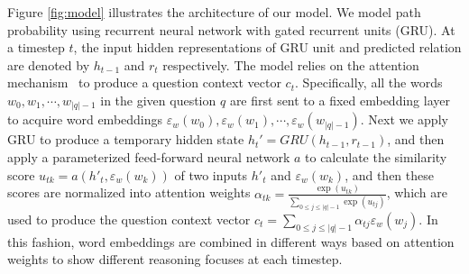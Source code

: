 

Figure \ref{fig:model} illustrates the architecture of our model. We model path probability using recurrent neural network with gated recurrent units (GRU). At a timestep $t$, the input hidden representations of GRU unit and predicted relation are denoted by $h_{t-1}$ and $r_t$ respectively. The model relies on the attention mechanism~\cite{DBLP:journals/corr/BahdanauCB14} to produce a question context vector $c_t$. Specifically, all the words $w_0,w_1,\cdots,w_{|q|-1}$ in the given question $q$ are first sent to a fixed embedding layer to acquire word embeddings $\varepsilon_w(w_0),\varepsilon_w(w_1),\cdots,\varepsilon_w(w_{|q|-1})$. Next we apply GRU to produce a temporary hidden state $h_{t}'=GRU(h_{t-1}, r_{t-1})$, and then apply a parameterized feed-forward neural network $a$ to calculate the similarity score $u_{tk} = a(h'_{t},\varepsilon_w(w_k))$ of two inputs $h'_{t}$ and $\varepsilon_w(w_k)$, and then these scores are normalized into attention weights $\alpha_{tk}=\frac{\exp (u_{tk})}{\sum_{0\leq j\leq |q|-1}\exp (u_{tj})}$, which are used to produce the question context vector $c_t=\sum_{0\leq j\leq |q|-1}\alpha_{tj}\varepsilon_w(w_j)$. In this fashion, word embeddings are combined in different ways based on attention weights to show different reasoning focuses at each timestep.


